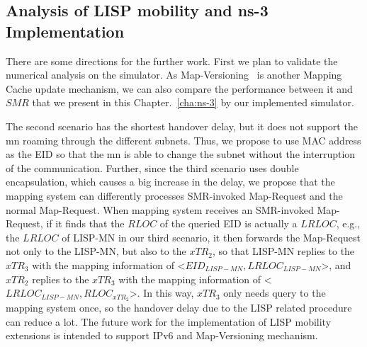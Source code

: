 \subsection{Analysis of LISP mobility and ns-3 Implementation}
There are some directions for the further work. First we plan to validate the numerical analysis on the simulator. As Map-Versioning~\cite{rfc6834} is another Mapping Cache update mechanism, we can also compare the performance between it and $SMR$ that we present in this Chapter.~\ref{cha:ns-3} by our implemented simulator. 

The second scenario has the shortest handover delay, but it does not support the \acrshort{mn} roaming through the different subnets. Thus, we propose to use MAC address as the EID so that the \acrshort{mn} is able to change the subnet without the interruption of the communication. Further, since the third scenario uses double encapsulation, which causes a big increase in the delay, we propose that the mapping system can differently processes SMR-invoked Map-Request and the normal Map-Request. When mapping system receives an SMR-invoked Map-Request, if it finds that the $RLOC$ of the queried EID is actually a $LRLOC$, e.g., the $LRLOC$ of LISP-MN in our third scenario, it then forwards the Map-Request not only to the LISP-MN, but also to the $xTR_2$, so that LISP-MN replies to the $xTR_3$ with the mapping information of <$EID_{LISP-MN}, LRLOC_{LISP-MN}$>, and $xTR_2$ replies to the $xTR_3$ with the mapping information of <$LRLOC_{LISP-MN}, RLOC_{xTR_2}$>. In this way, $xTR_3$ only needs query to the mapping system once, so the handover delay due to the LISP related procedure can reduce a lot. The future work for the implementation of LISP mobility extensions is intended to support IPv6 and Map-Versioning mechanism.